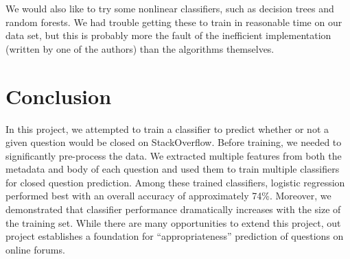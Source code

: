 \documentclass[11pt]{article}
\begin{document}
We would also like to try some nonlinear classifiers, such as decision trees and random forests. We had trouble getting these to train in reasonable time on our data set, but this is probably more the fault of the inefficient implementation (written by one of the authors) than the algorithms themselves.

\section{Conclusion}
In this project, we attempted to train a classifier to predict whether
or not a given question would be closed on StackOverflow. Before
training, we needed to significantly pre-process the data. We
extracted multiple features from both the metadata and body of each
question and used them to train multiple classifiers for closed
question prediction. Among these trained classifiers, logistic
regression performed best with an overall accuracy of approximately
74\%. Moreover, we demonstrated that classifier performance
dramatically increases with the size of the training set.  While there
are many opportunities to extend this project, out project establishes
a foundation for ``appropriateness'' prediction of questions on online
forums.

\pagebreak
{}

\end{document}
